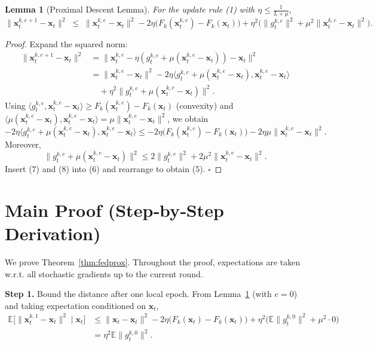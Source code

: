 \documentclass{article}
\newtheorem{lemma}{Lemma}
\begin{document}
\begin{lemma}[Proximal Descent Lemma]\label{lem:prox_bound}
For the update rule (1) with $\eta\le\frac{1}{L+\mu}$,
\[
    \|\mathbf{x}_{t}^{k,e+1}-\mathbf{x}_t\|^2
    \;\le\;
    \|\mathbf{x}_{t}^{k,e}-\mathbf{x}_t\|^2
    -2\eta\bigl(F_k(\mathbf{x}_{t}^{k,e})-F_k(\mathbf{x}_t)\bigr)
    +\eta^2\bigl(\|g_{t}^{k,e}\|^2+\mu^2\|\mathbf{x}_{t}^{k,e}-\mathbf{x}_t\|^2\bigr).
\tag{5}
\]
\end{lemma}
\begin{proof}
Expand the squared norm:
\[
\begin{aligned}
\|\mathbf{x}_{t}^{k,e+1}-\mathbf{x}_t\|^2
&=\|\mathbf{x}_{t}^{k,e}-\eta(g_{t}^{k,e}+\mu(\mathbf{x}_{t}^{k,e}-\mathbf{x}_t))-\mathbf{x}_t\|^2\\
&=\|\mathbf{x}_{t}^{k,e}-\mathbf{x}_t\|^2
   -2\eta\langle g_{t}^{k,e}+\mu(\mathbf{x}_{t}^{k,e}-\mathbf{x}_t),\mathbf{x}_{t}^{k,e}-\mathbf{x}_t\rangle\\
&\quad+\eta^2\|g_{t}^{k,e}+\mu(\mathbf{x}_{t}^{k,e}-\mathbf{x}_t)\|^2.
\end{aligned}
\tag{6}
\]
Using $\langle g_{t}^{k,e},\mathbf{x}_{t}^{k,e}-\mathbf{x}_t\rangle
   \ge F_k(\mathbf{x}_{t}^{k,e})-F_k(\mathbf{x}_t)$ (convexity) and
$\langle \mu(\mathbf{x}_{t}^{k,e}-\mathbf{x}_t),\mathbf{x}_{t}^{k,e}-\mathbf{x}_t\rangle
   =\mu\|\mathbf{x}_{t}^{k,e}-\mathbf{x}_t\|^2$, we obtain
\[
-2\eta\langle g_{t}^{k,e}+\mu(\mathbf{x}_{t}^{k,e}-\mathbf{x}_t),\mathbf{x}_{t}^{k,e}-\mathbf{x}_t\rangle
\le -2\eta\bigl(F_k(\mathbf{x}_{t}^{k,e})-F_k(\mathbf{x}_t)\bigr)
    -2\eta\mu\|\mathbf{x}_{t}^{k,e}-\mathbf{x}_t\|^2.
\tag{7}
\]
Moreover,
\[
\|g_{t}^{k,e}+\mu(\mathbf{x}_{t}^{k,e}-\mathbf{x}_t)\|^2
\le 2\|g_{t}^{k,e}\|^2+2\mu^2\|\mathbf{x}_{t}^{k,e}-\mathbf{x}_t\|^2.
\tag{8}
\]
Insert (7) and (8) into (6) and rearrange to obtain (5). \hfill $\square$
\end{proof}

\section*{Main Proof (Step‑by‑Step Derivation)}
We prove Theorem~\ref{thm:fedprox}. Throughout the proof, expectations are taken w.r.t. all stochastic gradients up to the current round.

\textbf{Step 1.}  Bound the distance after one local epoch.  
From Lemma~\ref{lem:prox_bound} (with $e=0$) and taking expectation conditioned on $\mathbf{x}_t$,
\[
\begin{aligned}
\mathbb{E}\bigl[\|\mathbf{x}_{t}^{k,1}-\mathbf{x}_t\|^2\mid\mathbf{x}_t\bigr]
&\le \|\mathbf{x}_t-\mathbf{x}_t\|^2
   -2\eta\bigl(F_k(\mathbf{x}_t)-F_k(\mathbf{x}_t)\bigr)
   +\eta^2\bigl(\mathbb{E}\|g_{t}^{k,0}\|^2+\mu^2\cdot0\bigr)\\
&= \eta^2\mathbb{E}\|g_{t}^{k,0}\|^2 .
\end{aligned}
\tag{9}
\]
\end{document}
